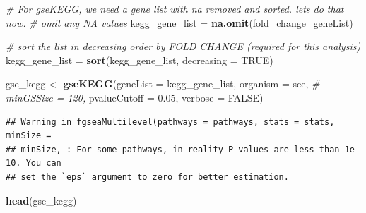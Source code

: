 \documentclass[
]{book}
\newenvironment{Shaded}{\begin{snugshade}}{\end{snugshade}}
\newcommand{\AttributeTok}[1]{\textcolor[rgb]{0.13,0.29,0.53}{#1}}
\newcommand{\CommentTok}[1]{\textcolor[rgb]{0.56,0.35,0.01}{\textit{#1}}}
\newcommand{\ConstantTok}[1]{\textcolor[rgb]{0.56,0.35,0.01}{#1}}
\newcommand{\FloatTok}[1]{\textcolor[rgb]{0.00,0.00,0.81}{#1}}
\newcommand{\FunctionTok}[1]{\textcolor[rgb]{0.13,0.29,0.53}{\textbf{#1}}}
\newcommand{\NormalTok}[1]{#1}
\newcommand{\OtherTok}[1]{\textcolor[rgb]{0.56,0.35,0.01}{#1}}
\newcommand{\StringTok}[1]{\textcolor[rgb]{0.31,0.60,0.02}{#1}}
\begin{document}
\begin{Shaded}
\begin{Highlighting}[]
\CommentTok{\# For gseKEGG, we need a gene list with na removed and sorted. let\textquotesingle{}s do that now.}
\CommentTok{\# omit any NA values }
\NormalTok{kegg\_gene\_list }\OtherTok{=} \FunctionTok{na.omit}\NormalTok{(fold\_change\_geneList)}

\CommentTok{\# sort the list in decreasing order by FOLD CHANGE (required for this analysis)}
\NormalTok{kegg\_gene\_list }\OtherTok{=} \FunctionTok{sort}\NormalTok{(kegg\_gene\_list, }\AttributeTok{decreasing =} \ConstantTok{TRUE}\NormalTok{)}

\NormalTok{gse\_kegg }\OtherTok{\textless{}{-}} \FunctionTok{gseKEGG}\NormalTok{(}\AttributeTok{geneList     =}\NormalTok{ kegg\_gene\_list,}
               \AttributeTok{organism     =} \StringTok{\textquotesingle{}sce\textquotesingle{}}\NormalTok{,}
               \CommentTok{\# minGSSize    = 120,}
               \AttributeTok{pvalueCutoff =} \FloatTok{0.05}\NormalTok{,}
               \AttributeTok{verbose      =} \ConstantTok{FALSE}\NormalTok{)}
\end{Highlighting}
\end{Shaded}

\begin{verbatim}
## Warning in fgseaMultilevel(pathways = pathways, stats = stats, minSize =
## minSize, : For some pathways, in reality P-values are less than 1e-10. You can
## set the `eps` argument to zero for better estimation.
\end{verbatim}

\begin{Shaded}
\begin{Highlighting}[]
\FunctionTok{head}\NormalTok{(gse\_kegg)}
\end{Highlighting}
\end{Shaded}
\end{document}
